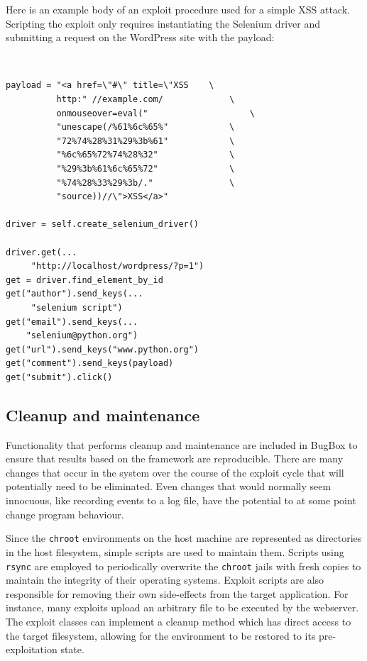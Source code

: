 \documentclass[letterpaper,twocolumn,10pt]{article}
\begin{document}
Here is an example body of an exploit procedure used for a simple XSS attack. Scripting the exploit only requires instantiating the Selenium driver and submitting a request on the WordPress site with the payload: 

\begin{minipage}{\textwidth}
{\tt \footnotesize
\begin{lstlisting}
payload = "<a href=\"#\" title=\"XSS	\
          http:" //example.com/				\
          onmouseover=eval(" 					\
          "unescape(/%61%6c%65%"			\
          "72%74%28%31%29%3b%61"			\
          "%6c%65%72%74%28%32"				\
          "%29%3b%61%6c%65%72"				\
          "%74%28%33%29%3b/." 				\
          "source))//\">XSS</a>"

driver = self.create_selenium_driver()

driver.get(...
     "http://localhost/wordpress/?p=1")
get = driver.find_element_by_id
get("author").send_keys(...
     "selenium script")
get("email").send_keys(...
    "selenium@python.org")
get("url").send_keys("www.python.org")
get("comment").send_keys(payload)
get("submit").click()
\end{lstlisting}
}
\end{minipage}


\subsection {Cleanup and maintenance}


Functionality that performs cleanup and maintenance are included in BugBox to ensure that results based on the framework are reproducible. There are many changes that occur in the system over the course of the exploit cycle that will potentially need to be eliminated. Even changes that would normally seem innocuous, like recording events to a log file, have the potential to at some point change program behaviour.  

Since the {\tt chroot} environments on the host machine are represented as directories in the host filesystem, simple scripts are used to maintain them.  Scripts using {\tt rsync} are employed to periodically overwrite the {\tt chroot} jails with fresh copies to maintain the integrity of their operating systems. Exploit scripts are also responsible for removing their own side-effects from the target application. For instance, many exploits upload an arbitrary file to be executed by the webserver. The exploit classes can implement a cleanup method which has direct access to the target filesystem, allowing for the environment to be restored to its pre-exploitation state. 
\end{document}
